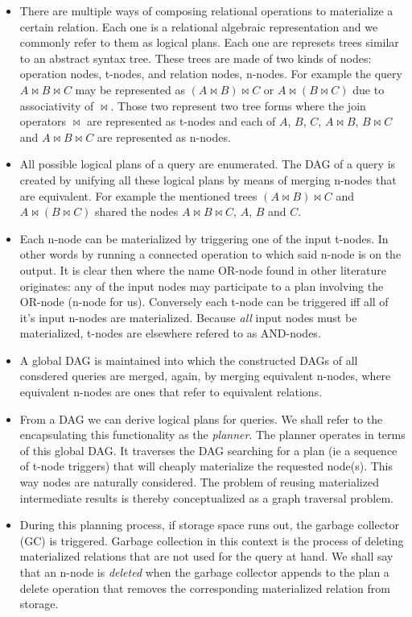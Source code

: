 \begin{itemize}
\item There are multiple ways of composing relational operations to
  materialize a certain relation. Each one is a relational algebraic
  representation and we commonly refer to them as logical plans. Each
  one are represets trees similar to an abstract syntax tree. These
  trees are made of two kinds of nodes: operation nodes, t-nodes, and
  relation nodes, n-nodes. For example the query \(A \Join B \Join C\)
  may be represented as \((A \Join B) \Join C\) or
  \(A \Join (B \Join C)\) due to associativity of \(\Join\). Those two
  represent two tree forms where the join operators \(\Join\) are
  represented as t-nodes and each of \(A\), \(B\), \(C\),
  \(A \Join B\), \(B \Join C\) and \(A \Join B \Join C\) are
  represented as n-nodes.
\item All possible logical plans of a query are enumerated. The DAG of
  a query is created by unifying all these logical plans by means of
  merging n-nodes that are equivalent. For example the mentioned trees
  \((A \Join B) \Join C\) and \(A \Join (B \Join C)\) shared the nodes
  \(A \Join B \Join C\), \(A\), \(B\) and \(C\).
\item Each n-node can be materialized by triggering one of the input
  t-nodes. In other words by running a connected operation to which
  said n-node is on the output. It is clear then where the name
  OR-node found in other literature originates: any of the input nodes
  may participate to a plan involving the OR-node (n-node for
  us). Conversely each t-node can be triggered iff all of it's input
  n-nodes are materialized. Because \emph{all} input nodes must be
  materialized, t-nodes are elsewhere refered to as AND-nodes.
\item A global DAG is maintained into which the constructed DAGs of
  all consdered queries are merged, again, by merging equivalent
  n-nodes, where equivalent n-nodes are ones that refer to equivalent
  relations.
\item From a DAG we can derive logical plans for queries. We shall refer
  to the encapsulating this functionality as the \emph{planner}. The
  planner operates in terms of this global DAG. It traverses the DAG
  searching for a plan (ie a sequence of t-node triggers) that will
  cheaply materialize the requested node(s). This way nodes are
  naturally considered. The problem of reusing materialized
  intermediate results is thereby conceptualized as a graph traversal
  problem.
\item During this planning process, if storage space runs out, the
  garbage collector (GC) is triggered. Garbage collection in this
  context is the process of deleting materialized relations that are
  not used for the query at hand. We shall say that an n-node is
  \emph{deleted} when the garbage collector appends to the plan a delete
  operation that removes the corresponding materialized relation
  from storage.
\end{itemize}

